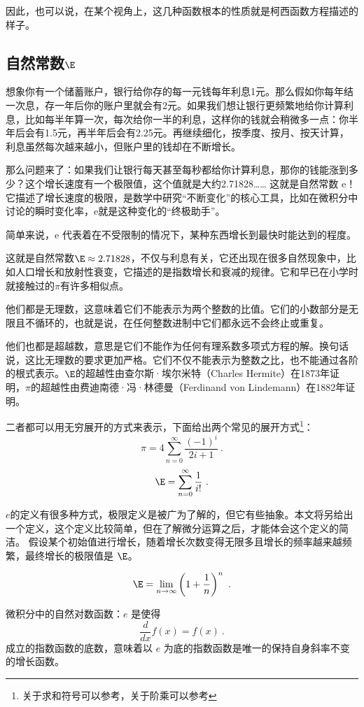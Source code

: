 因此，也可以说，在某个视角上，这几种函数根本的性质就是柯西函数方程描述的样子。

\subsection{自然常数$\E$}

想象你有一个储蓄账户，银行给你存的每一元钱每年利息1元。那么假如你每年结一次息，存一年后你的账户里就会有2元。如果我们想让银行更频繁地给你计算利息，比如每半年算一次，每次给你一半的利息，这样你的钱就会稍微多一点：你半年后会有1.5元，再半年后会有2.25元。再继续细化，按季度、按月、按天计算，利息虽然每次越来越小，但账户里的钱却在不断增长。

那么问题来了：如果我们让银行每天甚至每秒都给你计算利息，那你的钱能涨到多少？这个增长速度有一个极限值，这个值就是大约2.71828…… 这就是自然常数 e！它描述了增长速度的极限，是数学中研究“不断变化”的核心工具，比如在微积分中讨论的瞬时变化率，e就是这种变化的“终极助手”。

简单来说，e 代表着在不受限制的情况下，某种东西增长到最快时能达到的程度。

这就是自然常数$\E \approx 2.71828$，不仅与利息有关，它还出现在很多自然现象中，比如人口增长和放射性衰变，它描述的是指数增长和衰减的规律。它和早已在小学时就接触过的$\pi$有许多相似点。

他们都是无理数，这意味着它们不能表示为两个整数的比值。它们的小数部分是无限且不循环的，也就是说，在任何整数进制中它们都永远不会终止或重复。

他们也都是超越数，意思是它们不能作为任何有理系数多项式方程的解。换句话说，这比无理数的要求更加严格。它们不仅不能表示为整数之比，也不能通过各阶的根式表示。$\E$的超越性由查尔斯·埃尔米特（Charles Hermite）在1873年证明，$\pi$的超越性由费迪南德·冯·林德曼（Ferdinand von Lindemann）在1882年证明。

二者都可以用无穷展开的方式来表示，下面给出两个常见的展开方式\footnote{关于求和符号可以参考，关于阶乘可以参考}：
\begin{equation}
\pi=4\sum_{n=0}^\infty\frac{(-1)^i}{2i+1}~.
\end{equation}
\begin{equation}
\E=\sum_{n=0}^\infty\frac{1}{i!}~.
\end{equation}

$e$的定义有很多种方式，极限定义是被广为了解的，但它有些抽象。本文将另给出一个定义，这个定义比较简单，但在了解微分运算之后，才能体会这个定义的简洁。
假设某个初始值进行增长，随着增长次数变得无限多且增长的频率越来越频繁，最终增长的极限值是 $\E$。

\begin{equation}
\E = \lim_{n \to \infty} \left( 1 + \frac{1}{n} \right)^n~.
\end{equation}


微积分中的自然对数函数：$e$ 是使得
\begin{equation}
\frac{d}{dx} f(x) = f(x)~.
\end{equation}
成立的指数函数的底数，意味着以 $e$ 为底的指数函数是唯一的保持自身斜率不变的增长函数。

